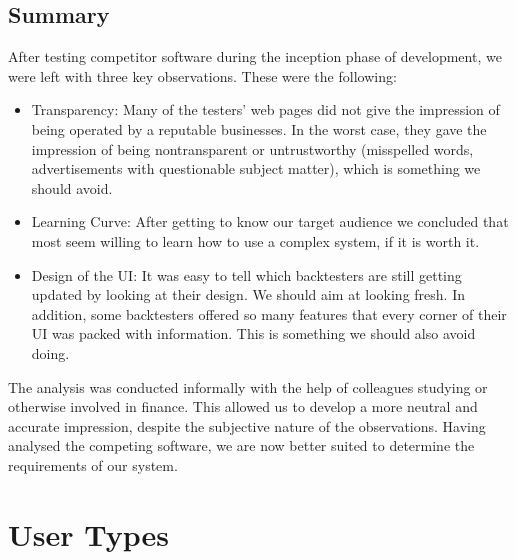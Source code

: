 \documentclass[main.tex]{subfiles}
\begin{document}
\subsection{Summary}
\label{reliability}

After testing competitor software during the inception phase of development, we were left with three key observations. These were the following:

\begin{itemize}
    \item Transparency: Many of the testers' web pages did not give the impression of being operated by a reputable businesses. In the worst case, they gave the impression of being nontransparent or untrustworthy (misspelled words, advertisements with questionable subject matter), which is something we should avoid.
    \item Learning Curve: After getting to know our target audience we concluded that most seem willing to learn how to use a complex system, if it is worth it.
    \item Design of the UI: It was easy to tell which backtesters are still getting updated by looking at their design. We should aim at looking fresh. In addition, some backtesters offered so many features that every corner of their UI was packed with information. This is something we should also avoid doing.
\end{itemize}

The analysis was conducted informally with the help of colleagues studying or otherwise involved in finance. This allowed us to develop a more neutral and accurate impression, despite the subjective nature of the observations. Having analysed the competing software, we are now better suited to determine the requirements of our system. 

\section{User Types}
\end{document}

